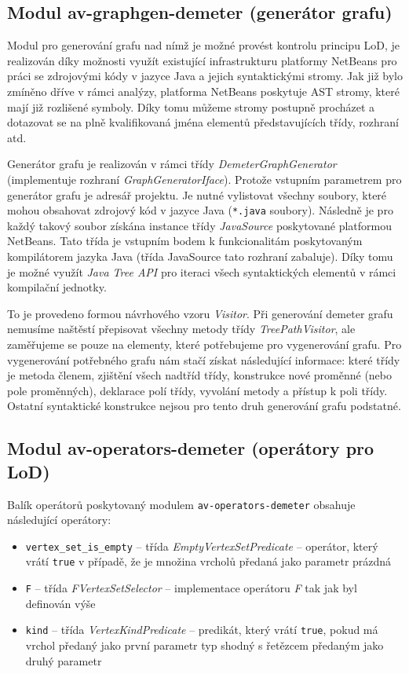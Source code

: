 \subsection{Modul av-graphgen-demeter (generátor grafu)}
Modul pro generování grafu nad nímž je možné provést kontrolu principu LoD, je realizován díky možnosti využít existující infrastrukturu platformy NetBeans pro práci se zdrojovými kódy v jazyce Java a jejich syntaktickými stromy. Jak již bylo zmíněno dříve v rámci analýzy, platforma NetBeans poskytuje AST stromy, které mají již rozlišené symboly. Díky tomu můžeme stromy postupně procházet a dotazovat se na plně kvalifikovaná jména elementů představujících třídy, rozhraní atd.

Generátor grafu je realizován v rámci třídy \emph{DemeterGraphGenerator} (implementuje rozhraní \emph{GraphGeneratorIface}). Protože vstupním parametrem pro generátor grafu je  adresář projektu. Je nutné vylistovat všechny soubory, které mohou obsahovat zdrojový kód v jazyce Java (\verb+*.java+ soubory). Následně je pro každý takový soubor získána instance třídy \emph{JavaSource} poskytované platformou NetBeans. Tato třída je vstupním bodem k funkcionalitám poskytovaným kompilátorem jazyka Java (třída JavaSource tato rozhraní zabaluje). Díky tomu je možné využít \emph{Java Tree API} pro iteraci všech syntaktických elementů v rámci kompilační jednotky.

To je provedeno formou návrhového vzoru \emph{Visitor}. Při generování demeter grafu nemusíme naštěstí přepisovat všechny metody třídy \emph{TreePathVisitor}, ale zaměřujeme se pouze na elementy, které potřebujeme pro vygenerování grafu. Pro vygenerování potřebného grafu nám stačí získat následující informace: které třídy je metoda členem, zjištění všech nadtříd třídy, konstrukce nové proměnné (nebo pole proměnných), deklarace polí třídy, vyvolání metody a přístup k poli třídy. Ostatní syntaktické konstrukce nejsou pro tento druh generování grafu podstatné.

\subsection{Modul av-operators-demeter (operátory pro LoD)}
Balík operátorů poskytovaný modulem \verb+av-operators-demeter+ obsahuje následující operátory:

\begin{itemize}
\item \verb+vertex_set_is_empty+ -- třída \emph{EmptyVertexSetPredicate} -- operátor, který vrátí \verb+true+ v případě, že je množina vrcholů předaná jako parametr prázdná
\item \verb+F+ -- třída \emph{FVertexSetSelector} -- implementace operátoru \emph{F} tak jak byl definován výše
\item \verb+kind+ -- třída \emph{VertexKindPredicate} -- predikát, který vrátí \verb+true+, pokud má vrchol předaný jako první parametr typ shodný s řetězcem předaným jako druhý parametr
\end{itemize}

